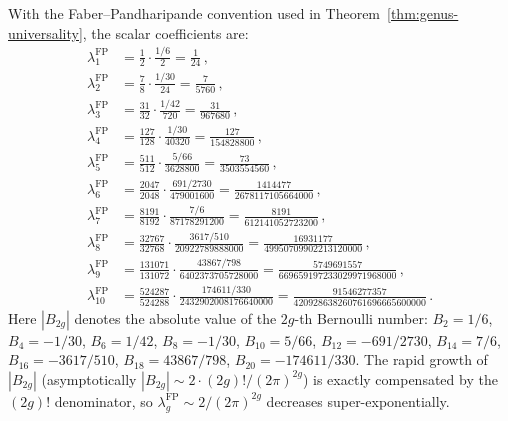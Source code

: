 \begin{proposition}
\label{prop:fp-coefficients}
With the Faber--Pandharipande convention used in
Theorem~\ref{thm:genus-universality}, the scalar coefficients are:
\begin{align}
\lambda_1^{\mathrm{FP}} &= \tfrac{1}{2} \cdot \tfrac{1/6}{2}
 = \tfrac{1}{24}\,,
 \label{eq:lambda1} \\
\lambda_2^{\mathrm{FP}} &= \tfrac{7}{8} \cdot \tfrac{1/30}{24}
 = \tfrac{7}{5760}\,,
 \label{eq:lambda2} \\
\lambda_3^{\mathrm{FP}} &= \tfrac{31}{32} \cdot \tfrac{1/42}{720}
 = \tfrac{31}{967680}\,,
 \label{eq:lambda3} \\
\lambda_4^{\mathrm{FP}} &= \tfrac{127}{128} \cdot \tfrac{1/30}{40320}
 = \tfrac{127}{154828800}\,,
 \label{eq:lambda4} \\
\lambda_5^{\mathrm{FP}} &= \tfrac{511}{512} \cdot \tfrac{5/66}{3628800}
 = \tfrac{73}{3503554560}\,,
 \label{eq:lambda5} \\
\lambda_6^{\mathrm{FP}} &= \tfrac{2047}{2048} \cdot \tfrac{691/2730}{479001600}
 = \tfrac{1414477}{2678117105664000}\,,
 \label{eq:lambda6} \\
\lambda_7^{\mathrm{FP}} &= \tfrac{8191}{8192} \cdot \tfrac{7/6}{87178291200}
 = \tfrac{8191}{612141052723200}\,,
 \label{eq:lambda7} \\
\lambda_8^{\mathrm{FP}} &= \tfrac{32767}{32768} \cdot \tfrac{3617/510}{20922789888000}
 = \tfrac{16931177}{49950709902213120000}\,,
 \label{eq:lambda8} \\
\lambda_9^{\mathrm{FP}} &= \tfrac{131071}{131072} \cdot \tfrac{43867/798}{6402373705728000}
 = \tfrac{5749691557}{669659197233029971968000}\,,
 \label{eq:lambda9} \\
\lambda_{10}^{\mathrm{FP}} &= \tfrac{524287}{524288} \cdot \tfrac{174611/330}{2432902008176640000}
 = \tfrac{91546277357}{420928638260761696665600000}\,.
 \label{eq:lambda10}
\end{align}
Here $|B_{2g}|$ denotes the absolute value of the $2g$-th
Bernoulli number: $B_2 = 1/6$, $B_4 = -1/30$, $B_6 = 1/42$,
$B_8 = -1/30$, $B_{10} = 5/66$, $B_{12} = -691/2730$,
$B_{14} = 7/6$, $B_{16} = -3617/510$, $B_{18} = 43867/798$,
$B_{20} = -174611/330$.
The rapid growth of $|B_{2g}|$ (asymptotically
$|B_{2g}| \sim 2 \cdot (2g)! / (2\pi)^{2g}$) is exactly
compensated by the $(2g)!$ denominator, so
$\lambda_g^{\mathrm{FP}} \sim 2/(2\pi)^{2g}$ decreases
super-exponentially.
\end{proposition}

